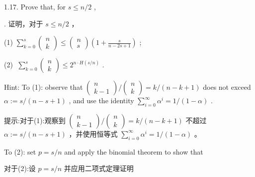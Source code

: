\documentclass[10pt]{article}
\begin{document}
1.17. Prove that, for \(s \leq  n/2\) ,

\begin{tcolorbox}. 证明，对于 \(s \leq  n/2\) ，
\end{tcolorbox}

(1) \(\mathop{\sum }\limits_{{k = 0}}^{s}\left( \begin{array}{l} n \\  k \end{array}\right)  \leq  \left( \begin{array}{l} n \\  s \end{array}\right) \left( {1 + \frac{s}{n - {2s} + 1}}\right)\) ;

(2) \(\;\mathop{\sum }\limits_{{k = 0}}^{s}\left( \begin{array}{l} n \\  k \end{array}\right)  \leq  {2}^{n \cdot  H\left( {s/n}\right) }\) .

Hint: To (1): observe that \(\left( \begin{matrix} n \\  k - 1 \end{matrix}\right) /\left( \begin{array}{l} n \\  k \end{array}\right)  = k/\left( {n - k + 1}\right)\) does not exceed \(\alpha  \mathrel{\text{ := }} s/\left( {n - s + 1}\right)\) , and use the identity \(\mathop{\sum }\limits_{{i = 0}}^{\infty }{\alpha }^{i} = 1/\left( {1 - \alpha }\right)\) .

\begin{tcolorbox}\relax
提示:对于(1):观察到 \(\left( \begin{matrix} n \\  k - 1 \end{matrix}\right) /\left( \begin{array}{l} n \\  k \end{array}\right)  = k/\left( {n - k + 1}\right)\) 不超过 \(\alpha  \mathrel{\text{ := }} s/\left( {n - s + 1}\right)\) ，并使用恒等式 \(\mathop{\sum }\limits_{{i = 0}}^{\infty }{\alpha }^{i} = 1/\left( {1 - \alpha }\right)\) 。
\end{tcolorbox}

To (2): set \(p = s/n\) and apply the binomial theorem to show that

\begin{tcolorbox}\relax
对于(2):设 \(p = s/n\) 并应用二项式定理证明
\end{tcolorbox}
\end{document}
